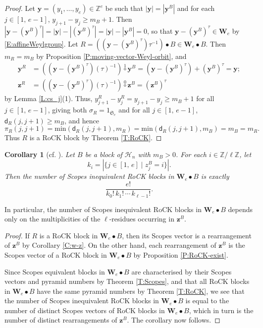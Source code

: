 \documentclass[11pt,a4paper,reqno]{amsart}
\numberwithin{equation}{section}
\theoremstyle{plain}
\newtheorem{cor}[thm]{Corollary}
\theoremstyle{definition}
\theoremstyle{remark}
\numberwithin{equation}{section}
\newcommand{\by}{\mathbf{y}}
\newcommand{\bz}{\mathbf{z}}
\renewcommand{\min}{\mathrm{min}}
\newcommand{\ZZ}{\mathbb{Z}}
\newcommand{\HH}{\mathcal{H}}
\newcommand{\AW}{\mathbf{W}}
\newcommand{\sym}[1]{\mathfrak{S}_{#1}}
\newcommand{\DDot}[1]{\mathrel{\overset{#1}{\bullet}}}
\newcommand{\CDot}[1]{\mathrel{\overset{#1}{\circ}}}
\newcommand{\dd}{\mathsf{d}}
\begin{document}
\begin{proof}
Let $\by = (y_1,\dotsc, y_{e}) \in \ZZ^e$ be such that $|\by| = |\by^B|$ and for each $j \in [1,\, e-1]$, $y_{j+1} - y_j \geq m_B+1$.
Then $|\by - (\by^B)^{\tau}| = |\by| - |(\by^B)^{\tau}| = |\by| - |\by^B| = 0$, so that $\by - (\by^B)^{\tau} \in \AW_e$ by \eqref{E:affineWeylgroup}.
Let $R = ((\by - (\by^B)^{\tau}) \tau^{-1}) \DDot{} B \in \AW_e \DDot{} B$.  Then $m_R = m_B$ by Proposition \ref{P:moving-vector-Weyl-orbit}, and  
\begin{align*}
\by^R &= ((\by - (\by^B)^{\tau}) (\tau)^{-1}) \CDot{1} \by^B = 
(\by - (\by^B)^{\tau}) + (\by^B)^{\tau} = \by; \\
\bz^R &= ((\by - (\by^B)^{\tau}) (\tau)^{-1}) \CDot{0} \bz^B = (\bz^B)^{\tau}
\end{align*}
by Lemma \ref{L:cs_j}(1).
Thus, $y^R_{j+1} - y^R_j = y_{j+1} - y_j \geq m_B+1$ for all $j \in [1,\,e-1]$, giving both $\sigma_R = 1_{\sym{e}}$ and for all $j \in [1,\,e-1]$, $\dd_R(j,j+1) \geq m_B$, and hence $$\pi_R(j,j+1) = \min(\dd_R(j,j+1), m_R) = \min(\dd_R(j,j+1), m_B) = m_B = m_R.$$  
Thus $R$ is a RoCK block by Theorem \ref{T:RoCK}.
\end{proof}


\begin{cor}[cf. {\cite[Theorem A]{Webster}}]
Let $B$ be a block of $\HH_n$ with $m_B > 0$.  For each $i \in \ZZ/\ell\ZZ$, let $$k_i = |\{ j \in [1,\,e] \mid z^B_j = i \}|.$$  Then the number of Scopes inequivalent RoCK blocks in $\AW_e \DDot{} B$ is exactly
$$
\frac{e!}{k_0!\, k_1!\, \dotsm \, k_{\ell-1}!}.
$$
\end{cor}

In particular, the number of Scopes inequivalent RoCK blocks in $\AW_e \DDot{} B$ depends only on the multiplicities of the $\ell$-residues occurring in $\bz^B$.

\begin{proof}
If $R$ is a RoCK block in $\AW_e \DDot{} B$, then its Scopes vector is a rearrangement of $\bz^B$ by Corollary \ref{C:w-z}.
On the other hand, each rearrangement of $\bz^B$ is the Scopes vector of a RoCK block in $\AW_e \DDot{} B$ by Proposition \ref{P:RoCK-exist}.  

Since Scopes equivalent blocks in $\AW_e \DDot{} B$ are characterised by their Scopes vectors and pyramid numbers by Theorem \ref{T:Scopes}, and that all RoCK blocks in $\AW_e \DDot{} B$ have the same pyramid numbers by Theorem \ref{T:RoCK}, we see that the number of Scopes inequivalent RoCK blocks in $\AW_e \DDot{} B$ is equal to the number of distinct Scopes vectors of RoCK blocks in $\AW_e \DDot{} B$, which in turn is the number of distinct rearrangements of $\bz^B$.  The corollary now follows.
\end{proof}
\end{document}
